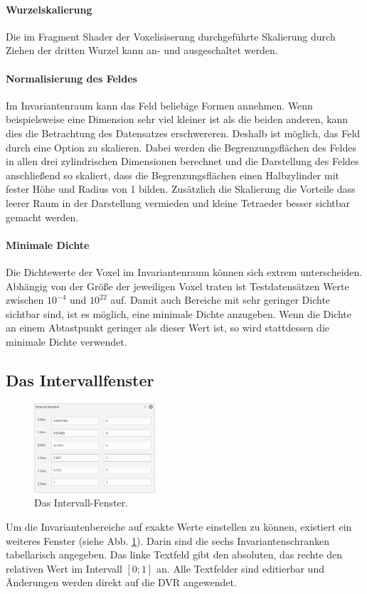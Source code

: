 \documentclass[a4paper,fontsize=12pt,toc=bib,halfparskip]{scrartcl}
\begin{document}
\paragraph{Wurzelskalierung}
Die im Fragment Shader der Voxelisiserung durchgef\"uhrte Skalierung durch Ziehen der dritten Wurzel kann an- und ausgeschaltet werden.

\paragraph{Normalisierung des Feldes}
Im Invariantenraum kann das Feld beliebige Formen annehmen. Wenn beispielsweise eine Dimension sehr viel kleiner ist als die beiden anderen, kann dies die Betrachtung des Datensatzes erschwereren. Deshalb ist m\"oglich, das Feld durch eine Option zu skalieren. Dabei werden die Begrenzungsfl\"achen des Feldes in allen drei zylindrischen Dimensionen berechnet und die Darstellung des Feldes anschlie{\ss}end so skaliert, dass die Begrenzungsfl\"achen einen Halbzylinder mit fester H\"ohe und Radius von 1 bilden. Zus\"atzlich die Skalierung die Vorteile dass leerer Raum in der Darstellung vermieden und kleine Tetraeder besser sichtbar gemacht werden.

\paragraph{Minimale Dichte}
Die Dichtewerte der Voxel im Invariantenraum k\"onnen sich extrem unterscheiden. Abh\"angig von der Gr\"o{\ss}e der jeweiligen Voxel traten ist Testdatens\"atzen Werte zwischen $10^{-4}$ und $10^22$ auf. Damit auch Bereiche mit sehr geringer Dichte sichtbar sind, ist es m\"oglich, eine minimale Dichte anzugeben. Wenn die Dichte an einem Abtastpunkt geringer als dieser Wert ist, so wird stattdessen die minimale Dichte verwendet.

\subsection{Das Intervallfenster}
\begin{figure}
	\centering
	\includegraphics[width=0.4\textwidth]{pictures/IntervalWindow.png}
	\caption{Das Intervall-Fenster.}
	\label{IntervalWindow}
\end{figure}
Um die Invariantenbereiche auf exakte Werte einstellen zu k\"onnen, existiert ein weiteres Fenster (siehe Abb. \ref{IntervalWindow}). Darin sind die sechs Invariantenschranken tabellarisch angegeben. Das linke Textfeld gibt den absoluten, das rechte den relativen Wert im Intervall $[0;1]$ an. Alle Textfelder sind editierbar und \"Anderungen werden direkt auf die DVR angewendet.
\end{document}

